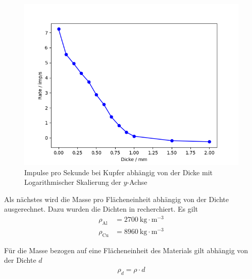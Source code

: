 \documentclass{article}
\begin{document}
\begin{figure}[H]
\centering
\includegraphics[scale=0.6]{Cu_imp_log.png}
\caption{Impulse pro Sekunde bei Kupfer abhängig von der Dicke mit Logarithmischer Skalierung der $y$-Achse}\label{fig:cu_imp_log}
\end{figure}



\newpage

Als nächstes wird die Masse pro Flächeneinheit abhängig von der Dichte ausgerechnet. Dazu wurden die Dichten in \cite{demtroeder} recherchiert. Es gilt
\begin{align*}
\rho_{\text{Al}} &= 2700~\text{kg} \cdot \text{m}^{-3}\\
\rho_{\text{Cu}} &= 8960~\text{kg} \cdot \text{m}^{-3}
\end{align*}

Für die Masse bezogen auf eine Flächeneinheit des Materials gilt abhängig von der Dichte $d$
\begin{align*}
\rho_d = \rho\cdot d
\end{align*}
\end{document}
